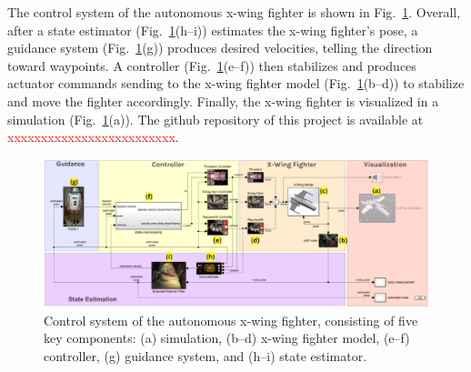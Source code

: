 
The control system of the autonomous x-wing fighter is shown in Fig.~\ref{fig:overview}. Overall, after a state estimator (Fig.~\ref{fig:overview}(h–i)) estimates the x-wing fighter's pose, a guidance system (Fig.~\ref{fig:overview}(g)) produces desired velocities, telling the direction toward waypoints. A controller (Fig.~\ref{fig:overview}(e–f)) then stabilizes and produces actuator commands sending to the x-wing fighter model (Fig.~\ref{fig:overview}(b–d)) to stabilize and move the fighter accordingly. Finally, the x-wing fighter is visualized in a simulation (Fig.~\ref{fig:overview}(a)). The github repository of this project is available at \textcolor{red}{xxxxxxxxxxxxxxxxxxxxxxxxx}.

\begin{figure}[!htbp]
	\centering
	\includegraphics[width=0.85\linewidth]{figures/overview}
	\caption{Control system of the autonomous x-wing fighter, consisting of five key components: (a) simulation, (b–d) x-wing fighter model, (e–f) controller, (g) guidance system, and (h–i) state estimator.}
	\label{fig:overview}
\end{figure}


